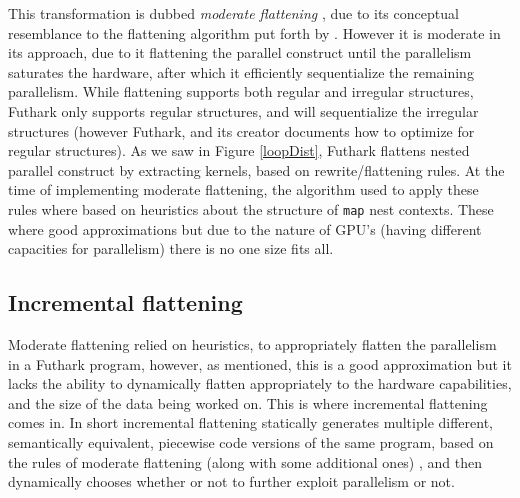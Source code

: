 This transformation is dubbed \textit{moderate flattening} \cite{futhark-nested-para}, due to its conceptual resemblance to the flattening algorithm put forth by \citeauthor{flat} \cite{flat}. However it is moderate in its approach, due to it flattening the parallel construct until the parallelism saturates the hardware, after which it efficiently sequentialize the remaining parallelism. While flattening supports both regular and irregular structures, Futhark only supports regular structures, and will sequentialize the irregular structures (however Futhark, and its creator documents how to optimize for regular structures). As we saw in Figure \ref{loopDist}, Futhark flattens nested parallel construct by extracting kernels, based on rewrite/flattening rules. At the time of implementing moderate flattening, the algorithm used to apply these rules where based on heuristics about the structure of \texttt{map} nest contexts. These where good approximations but due to the nature of GPU's (having different capacities for parallelism) there is no one size fits all. 


\subsection{Incremental flattening}
Moderate flattening relied on heuristics, to appropriately flatten the parallelism in a Futhark program, however, as mentioned, this is a good approximation but it lacks the ability to dynamically flatten appropriately to the hardware capabilities, and the size of the data being worked on. This is where incremental flattening comes in. In short incremental flattening statically generates multiple different, semantically equivalent, piecewise code versions of the same program, based on the rules of moderate flattening (along with some additional ones) \cite{inc-flat}, and then dynamically chooses whether or not to further exploit parallelism or not.  


